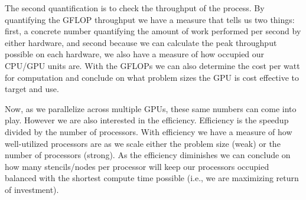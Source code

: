 \documentclass{report}
\begin{document}
The second quantification is to check the throughput of the process. By
quantifying the GFLOP throughput we have a measure that tells us two things:
first, a concrete number quantifying the amount of work performed per second by
either hardware, and second because we can calculate the peak throughput possible on
each hardware, we also have a measure of how occupied our CPU/GPU units are.
With the GFLOPs we can also determine the cost per watt for computation and
conclude on what problem sizes the GPU is cost effective to target and use. 

Now, as we parallelize across multiple GPUs, these same numbers can come into
play. However we are also interested in the efficiency. Efficiency is the
speedup divided by the number of processors. With efficiency we have a measure
of how well-utilized processors are as we scale either the problem size (weak)
or the number of processors (strong). As the efficiency diminishes we can
conclude on how many stencils/nodes per processor will keep our processors
occupied balanced with the shortest compute time possible (i.e., we are
maximizing return of investment). 


\ifstandalone


\end{document}
